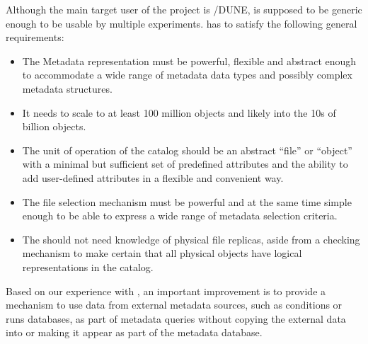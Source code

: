 \documentclass[../main-v1.tex]{subfiles}
\begin{document}
Although the main target user of the project is /DUNE,  is supposed to be generic enough to be usable by multiple experiments.    has to satisfy the following general requirements: 

\begin{itemize} 
\item 
The Metadata representation must be powerful, flexible and abstract enough to accommodate a wide range of metadata data types and possibly complex metadata structures. 

\item
It needs to scale to at least 100 million objects and likely into the 10s of billion objects. %

\item
The unit of operation of the catalog should be an abstract ``file'' or ``object'' with a  minimal but sufficient set of predefined   attributes and the ability to add user-defined   attributes in a flexible and convenient way. 

\item 
The file selection mechanism must be powerful and at the same time simple enough to be able to express a wide range of metadata selection criteria. 

\item 
The  should not need knowledge of physical file replicas, aside from a checking mechanism to make certain that all physical objects have logical representations in the catalog. 

\end{itemize} 
 

Based on our experience with , an important improvement is to provide a mechanism to use data from external metadata sources, such as conditions or runs databases, as part of metadata queries without copying the external data into or making it appear as part of the metadata database. 
\end{document}
